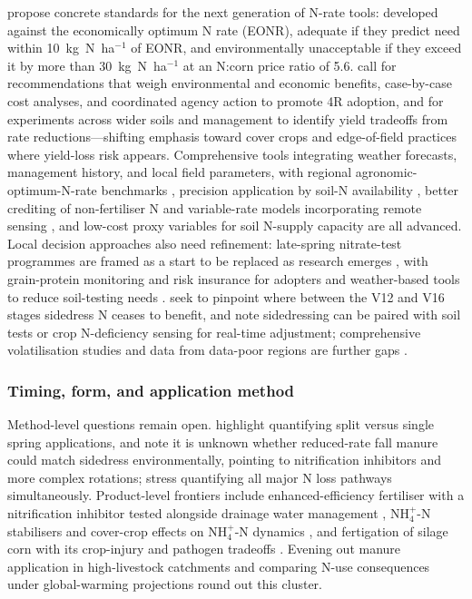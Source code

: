 \documentclass[11pt]{article}
\begin{document}
\textcite{Bandura2025} propose concrete standards for the next generation of
N-rate tools: developed against the economically optimum N rate (EONR),
adequate if they predict need within 10~kg~N~ha$^{-1}$ of EONR, and
environmentally unacceptable if they exceed it by more than 30~kg~N~ha$^{-1}$ at
an N:corn price ratio of 5.6. \textcite{Liu2021} call for recommendations that
weigh environmental and economic benefits, case-by-case cost analyses, and
coordinated agency action to promote 4R adoption, and \textcite{Banger2018} for
experiments across wider soils and management to identify yield tradeoffs from
rate reductions---shifting emphasis toward cover crops and edge-of-field
practices where yield-loss risk appears. Comprehensive tools integrating weather
forecasts, management history, and local field parameters, with regional
agronomic-optimum-N-rate benchmarks \parencite{Maas2022}, precision application
by soil-N availability \parencite{Gupta2023}, better crediting of non-fertiliser
N and variable-rate models incorporating remote sensing \parencite{Dinnes2002},
and low-cost proxy variables for soil N-supply capacity \parencite{Cassman2025}
are all advanced. Local decision approaches also need refinement: late-spring
nitrate-test programmes are framed as a start to be replaced as research emerges
\parencite{Jaynes2004}, with grain-protein monitoring and risk insurance for
adopters \parencite{Karlen2005} and weather-based tools to reduce soil-testing
needs \parencite{Malone2010}. \textcite{Jaynes2013} seek to pinpoint where
between the V12 and V16 stages sidedress N ceases to benefit, and
\textcite{Jaynes2015} note sidedressing can be paired with soil tests or crop
N-deficiency sensing for real-time adjustment; comprehensive volatilisation
studies and data from data-poor regions are further gaps \parencite{Chatterjee2020b}.

\subsubsection{Timing, form, and application method}

Method-level questions remain open. \textcite{Malone2007b} highlight quantifying
split versus single spring applications, and \textcite{HernandezRamirez2011}
note it is unknown whether reduced-rate fall manure could match sidedress
environmentally, pointing to nitrification inhibitors and more complex
rotations; \textcite{Elmi2005} stress quantifying all major N loss pathways
simultaneously. Product-level frontiers include enhanced-efficiency fertiliser
with a nitrification inhibitor tested alongside drainage water management
\parencite{Kaur2024c}, NH$_4^+$-N stabilisers and cover-crop effects on
NH$_4^+$-N dynamics \parencite{Vincent2025}, and fertigation of silage corn with
its crop-injury and pathogen tradeoffs \parencite{Gamble2018}. Evening out
manure application in high-livestock catchments \parencite{Bechmann2014} and
comparing N-use consequences under global-warming projections
\parencite{Haghnazari2020} round out this cluster.
\end{document}
